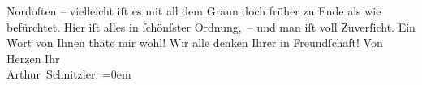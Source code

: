 \begin{ledgroupsized}[t]{13cm}
               Nordoſten – vielleicht iſt es mit all dem Graun doch früher zu Ende als wie
               befürchtet. Hier iſt alles in ſchönſster Ordnung, – und man iſt voll Zuverſicht. Ein
               Wort von Ihnen thäte mir wohl! Wir alle {\pb}denken
               Ihrer in Freundſchaft!\pend
           \pstart
           Von Herzen Ihr{\\[\baselineskip]}\spacefill\mbox{Arthur Schnitzler.}\pend
           \leftskip=0em{}          \endnumbering{}\end{ledgroupsized}  \newcommand{\dateiname}{L02200}\newcommand{\titel}{Arthur Schnitzler an Georg Brandes, 18. 12. 1914}\newcommand{\editorInnen}{Martin Anton Müller und Gerd-Hermann Susen}
      